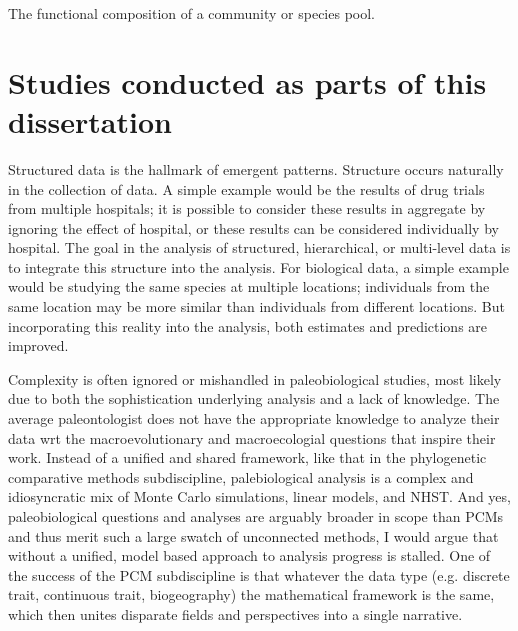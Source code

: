 The functional composition of a community or species pool.



\section{Studies conducted as parts of this dissertation}


Structured data is the hallmark of emergent patterns. Structure occurs naturally in the collection of data. A simple example would be the results of drug trials from multiple hospitals; it is possible to consider these results in aggregate by ignoring the effect of hospital, or these results can be considered individually by hospital. The goal in the analysis of structured, hierarchical, or multi-level data is to integrate this structure into the analysis. For biological data, a simple example would be studying the same species at multiple locations; individuals from the same location may be more similar than individuals from different locations. But incorporating this reality into the analysis, both estimates and predictions are improved.

Complexity is often ignored or mishandled in paleobiological studies, most likely due to both the sophistication underlying analysis and a lack of knowledge. The average paleontologist does not have the appropriate knowledge to analyze their data wrt the macroevolutionary and macroecologial questions that inspire their work. Instead of a unified and shared framework, like that in the phylogenetic comparative methods subdiscipline, palebiological analysis is a complex and idiosyncratic mix of Monte Carlo simulations, linear models, and NHST. And yes, paleobiological questions and analyses are arguably broader in scope than PCMs and thus merit such a large swatch of unconnected methods, I would argue that without a unified, model based approach to analysis progress is stalled. One of the success of the PCM subdiscipline is that whatever the data type (e.g. discrete trait, continuous trait, biogeography) the mathematical framework is the same, which then unites disparate fields and perspectives into a single narrative.


